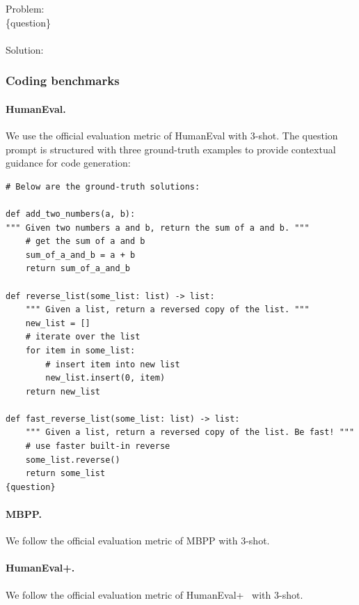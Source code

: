\begin{MyBox}{}

    Problem:\\
    \{question\}\\
    \\[\baselineskip]
    Solution:
\end{MyBox}

\subsubsection{Coding benchmarks}
\paragraph{HumanEval.} We use the official evaluation metric of HumanEval\cite{chen2021evaluatinglargelanguagemodels} with 3-shot. The question prompt is structured with three ground-truth examples to provide contextual guidance for code generation:

\begin{MyBox}{}
\small
\begin{verbatim}
# Below are the ground-truth solutions:

def add_two_numbers(a, b):
""" Given two numbers a and b, return the sum of a and b. """
    # get the sum of a and b
    sum_of_a_and_b = a + b
    return sum_of_a_and_b

def reverse_list(some_list: list) -> list:
    """ Given a list, return a reversed copy of the list. """
    new_list = []
    # iterate over the list
    for item in some_list:
        # insert item into new list
        new_list.insert(0, item)
    return new_list

def fast_reverse_list(some_list: list) -> list:
    """ Given a list, return a reversed copy of the list. Be fast! """
    # use faster built-in reverse
    some_list.reverse()
    return some_list
{question}
\end{verbatim}
\end{MyBox}

\paragraph{MBPP.} We follow the official evaluation metric of MBPP\cite{austin2021programsynthesislargelanguage} with 3-shot.

\paragraph{HumanEval+.} We follow the official evaluation metric of HumanEval+~\cite{liu2023evalplus} with 3-shot.

